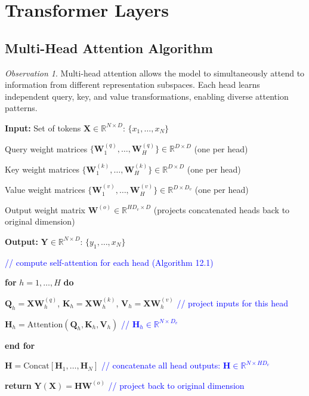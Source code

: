 \documentclass[11pt,a4paper]{article}
\theoremstyle{definition}
\theoremstyle{plain}
\theoremstyle{remark}
\newtheorem*{observation}{Observation}
\begin{document}
\section{Transformer Layers}

\subsection{Multi-Head Attention Algorithm}

\begin{observation}
Multi-head attention allows the model to simultaneously attend to information from different representation subspaces. Each head learns independent query, key, and value transformations, enabling diverse attention patterns.
\end{observation}

\begin{tcolorbox}[colback=red!10!white,colframe=red!75!black,title=\textbf{Algorithm 12.2: Multi-head attention}]
\textbf{Input:} Set of tokens $\mathbf{X} \in \mathbb{R}^{N \times D}$: $\{x_1, \ldots, x_N\}$

Query weight matrices $\{\mathbf{W}_1^{(q)}, \ldots, \mathbf{W}_H^{(q)}\} \in \mathbb{R}^{D \times D}$ (one per head)

Key weight matrices $\{\mathbf{W}_1^{(k)}, \ldots, \mathbf{W}_H^{(k)}\} \in \mathbb{R}^{D \times D}$ (one per head)

Value weight matrices $\{\mathbf{W}_1^{(v)}, \ldots, \mathbf{W}_H^{(v)}\} \in \mathbb{R}^{D \times D_v}$ (one per head)

Output weight matrix $\mathbf{W}^{(o)} \in \mathbb{R}^{HD_v \times D}$ (projects concatenated heads back to original dimension)

\textbf{Output:} $\mathbf{Y} \in \mathbb{R}^{N \times D}$: $\{y_1, \ldots, x_N\}$

\vspace{0.3cm}

\textcolor{blue}{// compute self-attention for each head (Algorithm 12.1)}

\textbf{for} $h = 1, \ldots, H$ \textbf{do}

\quad $\mathbf{Q}_h = \mathbf{X}\mathbf{W}_h^{(q)}$, $\mathbf{K}_h = \mathbf{X}\mathbf{W}_h^{(k)}$, $\mathbf{V}_h = \mathbf{X}\mathbf{W}_h^{(v)}$ \textcolor{blue}{// project inputs for this head}

\quad $\mathbf{H}_h = \text{Attention}(\mathbf{Q}_h, \mathbf{K}_h, \mathbf{V}_h)$ \textcolor{blue}{// $\mathbf{H}_h \in \mathbb{R}^{N \times D_v}$}

\textbf{end for}

$\mathbf{H} = \text{Concat}[\mathbf{H}_1, \ldots, \mathbf{H}_N]$ \textcolor{blue}{// concatenate all head outputs: $\mathbf{H} \in \mathbb{R}^{N \times HD_v}$}

\textbf{return} $\mathbf{Y}(\mathbf{X}) = \mathbf{H}\mathbf{W}^{(o)}$ \textcolor{blue}{// project back to original dimension}
\end{tcolorbox}
\end{document}

